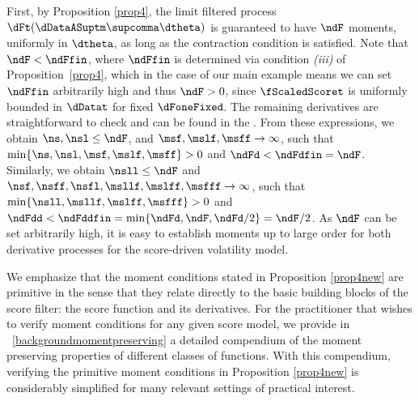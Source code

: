 \begin{exmc} %
First, by Proposition \ref{prop4}, the limit filtered process $\dFt(\dDataASuptm\supcomma\dtheta)$ is guaranteed to have $\ndF$ moments, uniformly in $\dtheta$, as long as the contraction condition is satisfied. 
Note that $\ndF < \ndFfin$, where $\ndFfin$ is determined via condition \textit{(iii)} of Proposition~\ref{prop4}, which in the case of our main example means we can set $\ndFfin$ arbitrarily high and thus $\ndF>0$, since $\fScaledScoret$ is uniformly bounded in $\dDatat$ for fixed $\dFoneFixed$.
The remaining derivatives are straightforward to check and can be found in the \SupplementaryAppendix. 
From these expressions, we obtain
$\ns,\nsl \leq \ndF$, and $\msf, \mslf,\msff \to \infty$, such that $\min\{\ns,\nsl,\msf,\mslf,\msff\} > 0 $ and $\ndFd < \ndFdfin = \ndF$.
Similarly, we obtain
$\nsll \leq \ndF$ and $\nsf, \nsff, \nsfl, \msllf,\mslff,\msfff \to \infty$, such that $\min\{\nsll,\msllf,\mslff,\msfff\} > 0$ and $\ndFdd < \ndFddfin = \min\{\ndFd, \ndF, \ndFd/2\} = \ndF/2$.
As $\ndF$ can be set arbitrarily high, it is easy to establish moments up to large order for both derivative processes for the score-driven volatility model.
\end{exmc}

We emphasize that the moment conditions stated in Proposition \ref{prop4new} are primitive in the sense that they relate directly to the basic building blocks of the score filter: the score function and its derivatives. 
For the practitioner that wishes to verify moment conditions for any given score model, we provide in \SupplementaryAppendix~\ref{backgroundmomentpreserving} a detailed  compendium of the moment preserving properties of different classes of functions. With this compendium, verifying the primitive moment conditions in Proposition \ref{prop4new} is considerably simplified for many relevant settings of practical interest.





























